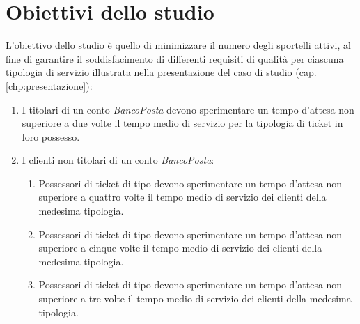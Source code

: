 \chapter{Obiettivi dello studio}\label{chp:obiettivi}
L'obiettivo dello studio è quello di minimizzare il numero degli sportelli attivi, al fine di garantire il soddisfacimento di differenti requisiti di qualità per ciascuna tipologia di servizio illustrata nella presentazione del caso di studio (cap. \ref{chp:presentazione}):

\begin{enumerate}[label=QoS-\arabic*), align=left, leftmargin=*]
\item I titolari di un conto \textsl{BancoPosta} devono sperimentare un tempo d'attesa non superiore a due volte il tempo medio di servizio per la tipologia di ticket in loro possesso.
\item I clienti non titolari di un conto \textsl{BancoPosta}:
\begin{enumerate}
\item Possessori di ticket di tipo \uo{} devono sperimentare un tempo d'attesa non superiore a quattro volte il tempo medio di servizio dei clienti della medesima tipologia.
\item Possessori di ticket di tipo \pp{} devono sperimentare un tempo d'attesa non superiore a cinque volte il tempo medio di servizio dei clienti della medesima tipologia.
\item Possessori di ticket di tipo \sr{} devono sperimentare un tempo d'attesa non superiore a tre volte il tempo medio di servizio dei clienti della medesima tipologia.
\end{enumerate}
\end{enumerate}
